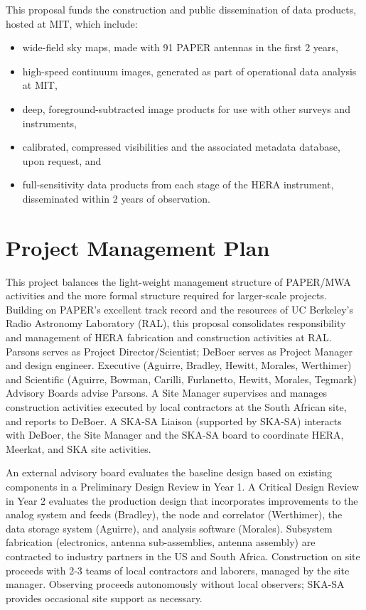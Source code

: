 \documentclass[preprint]{aastex}
\begin{document}
This proposal funds the construction and public dissemination of data products, hosted at MIT,
which include:
\begin{itemize}\setlength{\parskip}{0pt}\itemsep0pt
\item wide-field sky maps, made with 91 PAPER antennas in the first 2 years, 
\item high-speed continuum images, generated as part of operational data analysis at MIT,
\item deep, foreground-subtracted image products for use with other surveys and instruments,
\item calibrated, compressed visibilities and the associated metadata database, upon request, and
\item full-sensitivity data products from each stage of the HERA instrument, disseminated
within 2 years of observation.
\end{itemize}

\vspace{-0.25in}
\section{Project Management Plan}

This project balances the light-weight
management structure of PAPER/MWA activities and the more formal structure
required for larger-scale projects.  Building on PAPER's excellent track record
and the resources of UC Berkeley's Radio Astronomy Laboratory (RAL),
this proposal consolidates responsibility and management of HERA
fabrication and construction activities at RAL. Parsons serves as
Project Director/Scientist; DeBoer serves as Project Manager and design engineer.
Executive
(Aguirre, Bradley, Hewitt, Morales, Werthimer)
and Scientific (Aguirre, Bowman, Carilli, Furlanetto, Hewitt, Morales, Tegmark) Advisory Boards advise Parsons.
A Site Manager supervises and manages
construction activities executed by local contractors at the South African
site, and reports to DeBoer.  A SKA-SA Liaison (supported by SKA-SA)
interacts with DeBoer, the Site Manager and the SKA-SA board to
coordinate HERA, Meerkat, and SKA site activities.

An external advisory board evaluates the baseline design
based on existing components in a Preliminary Design Review in Year 1.
A Critical Design Review in Year 2 evaluates the
production design that incorporates improvements to the analog system
and feeds (Bradley), the node and correlator (Werthimer), the data storage
system (Aguirre), and analysis software (Morales).
Subsystem fabrication (electronics, antenna sub-assemblies, antenna assembly)
are contracted to industry partners in the US and South Africa.   Construction on site proceeds
with 2-3 teams of local contractors and laborers, managed by the site manager.  Observing proceeds 
autonomously without local observers; SKA-SA
provides occasional site support as necessary.
\end{document}
